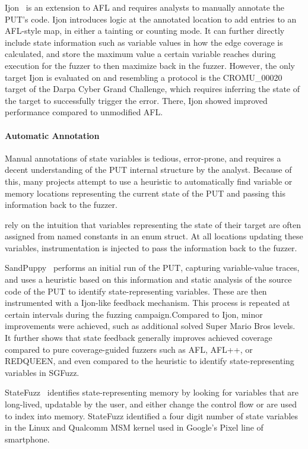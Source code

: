 \documentclass{article}
\let\savedCite=\cite
\renewcommand{\cite}{\unskip~\savedCite}
\begin{document}
\begin{multicols}{2}
  Ijon\cite{Ijon} is an extension to AFL and requires analysts to manually annotate the PUT's code. Ijon introduces logic at the annotated location to add entries to an AFL-style map, in either a tainting or counting mode. It can further directly include state information such as variable values in how the edge coverage is calculated, and store the maximum value a certain variable reaches during execution for the fuzzer to then maximize back in the fuzzer. However, the only target Ijon is evaluated on and resembling a protocol is the CROMU\_00020 target of the Darpa Cyber Grand Challenge, which requires inferring the state of the target to successfully trigger the error. There, Ijon showed improved performance compared to unmodified AFL.

  \paragraph{Automatic Annotation}

  Manual annotations of state variables is tedious, error-prone, and requires a decent understanding of the PUT internal structure by the analyst. Because of this, many projects attempt to use a heuristic to automatically find variable or memory locations representing the current state of the PUT and passing this information back to the fuzzer.

  \citeauthor{SGFuzz} rely on the intuition that variables representing the state of their target are often assigned from named constants in an enum struct. At all locations updating these variables, instrumentation is injected to pass the information back to the fuzzer.\cite{SGFuzz}

  SandPuppy\cite{SandPuppy} performs an initial run of the PUT, capturing variable-value traces, and uses a heuristic based on this information and static analysis of the source code of the PUT to identify state-representing variables. These are then instrumented with a Ijon-like feedback mechanism. This process is repeated at certain intervals during the fuzzing campaign.Compared to Ijon, minor improvements were achieved, such as additional solved Super Mario Bros levels. It further shows that state feedback generally improves achieved coverage compared to pure coverage-guided fuzzers such as AFL, AFL++, or REDQUEEN, and even compared to the heuristic to identify state-representing variables in SGFuzz.

  StateFuzz\cite{StateFuzz} identifies state-representing memory by looking for variables that are long-lived, updatable by the user, and either change the control flow or are used to index into memory. StateFuzz identified a four digit number of state variables in the Linux and Qualcomm MSM kernel used in Google's Pixel line of smartphone.


\end{multicols}
\end{document}
